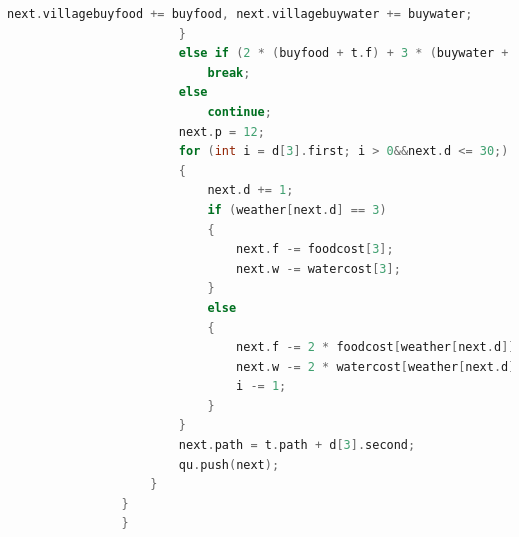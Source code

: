 \documentclass[withoutpreface,bwprint]{cumcmthesis} %
\begin{document}
\begin{appendices}
\begin{lstlisting}[language=c++]
                            next.villagebuyfood += buyfood, next.villagebuywater += buywater;
                        }
                        else if (2 * (buyfood + t.f) + 3 * (buywater + t.w) > 1200)
                            break;
                        else
                            continue;
                        next.p = 12;
                        for (int i = d[3].first; i > 0&&next.d <= 30;)
                        {
                            next.d += 1;
                            if (weather[next.d] == 3)
                            {
                                next.f -= foodcost[3];
                                next.w -= watercost[3];
                            }
                            else
                            {
                                next.f -= 2 * foodcost[weather[next.d]];
                                next.w -= 2 * watercost[weather[next.d]];
                                i -= 1;
                            }
                        }
                        next.path = t.path + d[3].second;
                        qu.push(next);
                    }
                }
                }


\end{lstlisting}
\end{appendices}
\end{document}
